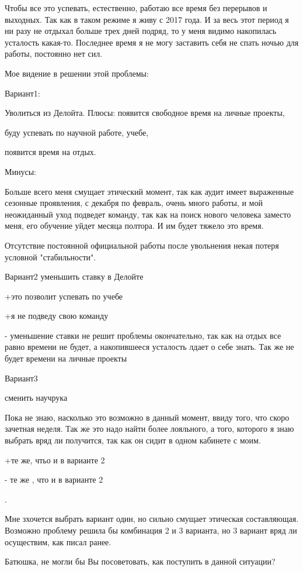 \documentclass[a4paper,12pt]{article} %
\begin{document}
Чтобы все это успевать, естественно, работаю все время без перерывов и выходных. Так как в таком режиме я живу с 2017 года. И за весь этот период я ни разу не отдыхал больше трех дней подряд, то у меня видимо накопилась усталость какая-то. Последнее время я не могу заставить себя не спать ночью для работы, постоянно нет сил.

Мое видение в решении этой проблемы:

Вариант1:

Уволиться из Делойта. 
Плюсы: 
появится свободное время на личные проекты, 

буду успевать по научной работе, учебе, 

появится время на отдых.

Минусы: 

Больше всего меня смущает этический момент, так как аудит имеет выраженные сезонные проявления, с декабря по февраль, очень много работы, и мой неожиданный уход подведет команду, так как на поиск нового человека заместо меня, его обучение уйдет месяца полтора. И им будет тяжело это время. 

Отсутствие постоянной официальной работы после увольнения  некая потеря условной "стабильности".


Вариант2
уменьшить ставку в Делойте

+это позволит успевать по учебе 

+я не подведу свою команду

- уменьшение ставки не решит проблемы окончательно, так как на отдых все равно времени не будет, а накопившееся усталость лдает о себе знать. Так же не будет времени на личные проекты

Вариант3

сменить научрука

Пока не знаю, насколько это возможно в данный момент, ввиду того, что скоро зачетная неделя. Так же это надо найти более лояльного, а того, которого я знаю выбрать вряд ли получится, так как он сидит в одном кабинете с моим.

+те же, чтьо и в варианте 2

- те же , что и в варианте 2

.

Мне зхочется выбрать вариант один, но сильно смущает этическая составляющая. Возможно проблему решила бы комбинация 2 и 3 варианта, но 3 вариант вряд ли осуществим, как писал ранее. 

Батюшка, не могли бы Вы посоветовать, как поступить в данной ситуации?
\end{document}
